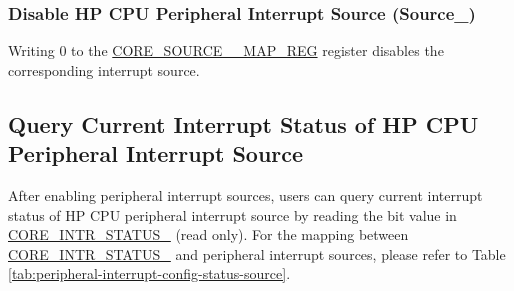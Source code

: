 \documentclass[main\_\_EN.tex]{subfiles}
\begin{document}
\subsubsection{Disable HP CPU Peripheral Interrupt Source (Source\_)}

Writing 0 to the \hyperref[regdesc:CORE0SOURCEregindexYMAPREG]{CORE\_SOURCE\_\_MAP\_REG} register disables the corresponding interrupt source.

\subsection{Query Current Interrupt Status of HP CPU Peripheral Interrupt Source}

After enabling peripheral interrupt sources, users can query current interrupt status of HP CPU peripheral interrupt source by reading the bit value in \hyperref[fielddesc:CORE0INTRSTATUS0]{CORE\_INTR\_STATUS\_} (read only). For the mapping between \hyperref[fielddesc:CORE0INTRSTATUS0]{CORE\_INTR\_STATUS\_} and peripheral interrupt sources, please refer to Table \ref{tab:peripheral-interrupt-config-status-source}.












\end{document}
